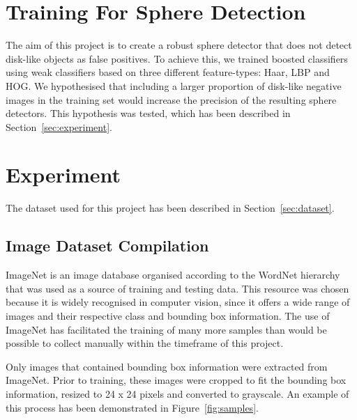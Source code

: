 \documentclass{llncs}
\begin{document}
	\section{Training For Sphere Detection} {

		The aim of this project is to create a robust sphere detector that does not detect disk-like objects as false positives. To achieve this, we trained boosted classifiers using weak classifiers based on three different feature-types: Haar, LBP and HOG. We hypothesised that including a larger proportion of disk-like negative images in the training set would increase the precision of the resulting sphere detectors. This hypothesis was tested, which has been described in Section~\ref{sec:experiment}.

	}

	\section{Experiment} {
	\label{sec:experiment}


		The dataset used for this project has been described in Section~\ref{sec:dataset}.

		\subsection{Image Dataset Compilation} {
		\label{sec:dataset}

			ImageNet is an image database organised according to the WordNet hierarchy \citep{imagenet_cvpr09, fellbaum1998wordnet} that was used as a source of training and testing data. This resource was chosen because it is widely recognised in computer vision, since it offers a wide range of images and their respective class and bounding box information. The use of ImageNet has facilitated the training of many more samples than would be possible to collect manually within the timeframe of this project.


			Only images that contained bounding box information were extracted from ImageNet. Prior to training, these images were cropped to fit the bounding box information, resized to 24 x 24 pixels and converted to grayscale. An example of this process has been demonstrated in Figure~\ref{fig:samples}.

}}
\end{document}
